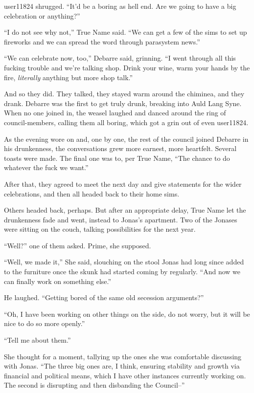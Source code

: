 user11824 shrugged. ``It'd be a boring as hell end. Are we going to have a big celebration or anything?''

``I do not see why not,'' True Name said. ``We can get a few of the sims to set up fireworks and we can spread the word through parasystem news.''

``We can celebrate now, too,'' Debarre said, grinning. ``I went through all this fucking trouble and we're talking shop. Drink your wine, warm your hands by the fire, \emph{literally} anything but more shop talk.''

And so they did. They talked, they stayed warm around the chiminea, and they drank. Debarre was the first to get truly drunk, breaking into Auld Lang Syne. When no one joined in, the weasel laughed and danced around the ring of council-members, calling them all boring, which got a grin out of even user11824.

As the evening wore on and, one by one, the rest of the council joined Debarre in his drunkenness, the conversations grew more earnest, more heartfelt. Several toasts were made. The final one was to, per True Name, ``The chance to do whatever the fuck we want.''

After that, they agreed to meet the next day and give statements for the wider celebrations, and then all headed back to their home sims.

Others headed back, perhaps. But after an appropriate delay, True Name let the drunkenness fade and went, instead to Jonas's apartment. Two of the Jonases were sitting on the couch, talking possibilities for the next year.

``Well?'' one of them asked. Prime, she supposed.

``Well, we made it,'' She said, slouching on the stool Jonas had long since added to the furniture once the skunk had started coming by regularly. ``And now we can finally work on something else.''

He laughed. ``Getting bored of the same old secession arguments?''

``Oh, I have been working on other things on the side, do not worry, but it will be nice to do so more openly.''

``Tell me about them.''

She thought for a moment, tallying up the ones she was comfortable discussing with Jonas. ``The three big ones are, I think, ensuring stability and growth via financial and political means, which I have other instances currently working on. The second is disrupting and then disbanding the Council--''

